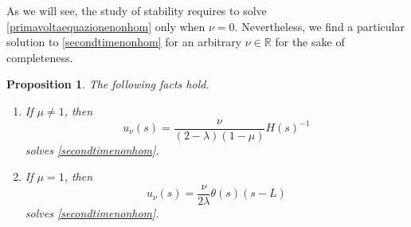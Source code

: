 \documentclass[11pt]{amsart}
\newcommand{\rr}{{\mathbb{R}}}
\newtheorem{proposition}[theorem]{Proposition}
\theoremstyle{definition}
\theoremstyle{remark}
\numberwithin{equation}{section}
\begin{document}
As we will see, the study of stability requires to solve \eqref{primavoltaequazionenonhom} only when $\nu=0$. Nevertheless, we find a particular solution to \eqref{secondtimenonhom} for an arbitrary $\nu\in\rr$ for the sake of completeness.
\begin{proposition}
The following facts hold.
\begin{enumerate}
\item [(i)]If $\mu\neq 1$, then 
\begin{equation*}
	u_\nu(s)=\frac{\nu}{(2-\lambda)(1-\mu)}H(s)^{-1}
\end{equation*}
solves \eqref{secondtimenonhom}.
\item [(ii)] If $\mu=1$, then
\begin{equation*}
	u_\nu(s)=\frac{\nu}{2\lambda}\theta(s)(s-L)
\end{equation*}
solves \eqref{secondtimenonhom}.

\end{enumerate}
\end{proposition}
\end{document}
